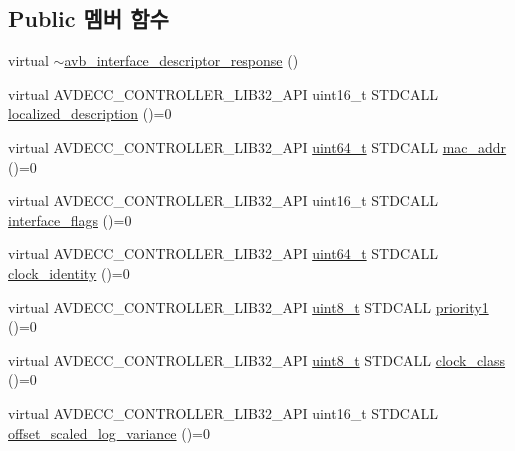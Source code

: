 \subsection*{Public 멤버 함수}
\begin{DoxyCompactItemize}
\item 
virtual \hyperlink{classavdecc__lib_1_1avb__interface__descriptor__response_a96723d9072109bd6e545d8823167d52e}{$\sim$avb\+\_\+interface\+\_\+descriptor\+\_\+response} ()
\item 
virtual A\+V\+D\+E\+C\+C\+\_\+\+C\+O\+N\+T\+R\+O\+L\+L\+E\+R\+\_\+\+L\+I\+B32\+\_\+\+A\+PI uint16\+\_\+t S\+T\+D\+C\+A\+LL \hyperlink{classavdecc__lib_1_1avb__interface__descriptor__response_a1fb9de45567df344090a1407aa6b775f}{localized\+\_\+description} ()=0
\item 
virtual A\+V\+D\+E\+C\+C\+\_\+\+C\+O\+N\+T\+R\+O\+L\+L\+E\+R\+\_\+\+L\+I\+B32\+\_\+\+A\+PI \hyperlink{parse_8c_aec6fcb673ff035718c238c8c9d544c47}{uint64\+\_\+t} S\+T\+D\+C\+A\+LL \hyperlink{classavdecc__lib_1_1avb__interface__descriptor__response_aeefc128adde1e419ae731c1a05791053}{mac\+\_\+addr} ()=0
\item 
virtual A\+V\+D\+E\+C\+C\+\_\+\+C\+O\+N\+T\+R\+O\+L\+L\+E\+R\+\_\+\+L\+I\+B32\+\_\+\+A\+PI uint16\+\_\+t S\+T\+D\+C\+A\+LL \hyperlink{classavdecc__lib_1_1avb__interface__descriptor__response_ab7fe1dff73b89a46f6eaced839a16753}{interface\+\_\+flags} ()=0
\item 
virtual A\+V\+D\+E\+C\+C\+\_\+\+C\+O\+N\+T\+R\+O\+L\+L\+E\+R\+\_\+\+L\+I\+B32\+\_\+\+A\+PI \hyperlink{parse_8c_aec6fcb673ff035718c238c8c9d544c47}{uint64\+\_\+t} S\+T\+D\+C\+A\+LL \hyperlink{classavdecc__lib_1_1avb__interface__descriptor__response_a25301d8ad0be863448197df63d847666}{clock\+\_\+identity} ()=0
\item 
virtual A\+V\+D\+E\+C\+C\+\_\+\+C\+O\+N\+T\+R\+O\+L\+L\+E\+R\+\_\+\+L\+I\+B32\+\_\+\+A\+PI \hyperlink{stdint_8h_aba7bc1797add20fe3efdf37ced1182c5}{uint8\+\_\+t} S\+T\+D\+C\+A\+LL \hyperlink{classavdecc__lib_1_1avb__interface__descriptor__response_a9c883a3dd7880a9556aa7d78c03d5506}{priority1} ()=0
\item 
virtual A\+V\+D\+E\+C\+C\+\_\+\+C\+O\+N\+T\+R\+O\+L\+L\+E\+R\+\_\+\+L\+I\+B32\+\_\+\+A\+PI \hyperlink{stdint_8h_aba7bc1797add20fe3efdf37ced1182c5}{uint8\+\_\+t} S\+T\+D\+C\+A\+LL \hyperlink{classavdecc__lib_1_1avb__interface__descriptor__response_aa6030a1199f813b420f204facd3035d9}{clock\+\_\+class} ()=0
\item 
virtual A\+V\+D\+E\+C\+C\+\_\+\+C\+O\+N\+T\+R\+O\+L\+L\+E\+R\+\_\+\+L\+I\+B32\+\_\+\+A\+PI uint16\+\_\+t S\+T\+D\+C\+A\+LL \hyperlink{classavdecc__lib_1_1avb__interface__descriptor__response_ad36916ce5037d1700c88b81901bcd972}{offset\+\_\+scaled\+\_\+log\+\_\+variance} ()=0

\end{DoxyCompactItemize}
